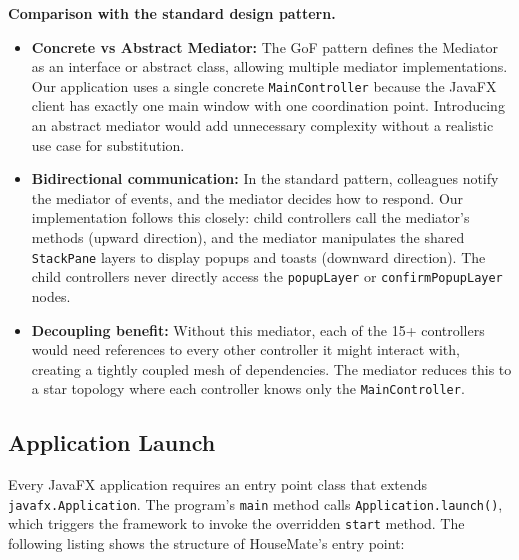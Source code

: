 \textbf{Comparison with the standard design pattern.}
\begin{itemize}
    \item \textbf{Concrete vs Abstract Mediator:} The GoF pattern defines the Mediator as an interface or abstract class, allowing multiple mediator implementations. Our application uses a single concrete \texttt{MainController} because the JavaFX client has exactly one main window with one coordination point. Introducing an abstract mediator would add unnecessary complexity without a realistic use case for substitution.
    \item \textbf{Bidirectional communication:} In the standard pattern, colleagues notify the mediator of events, and the mediator decides how to respond. Our implementation follows this closely: child controllers call the mediator's methods (upward direction), and the mediator manipulates the shared \texttt{StackPane} layers to display popups and toasts (downward direction). The child controllers never directly access the \texttt{popupLayer} or \texttt{confirmPopupLayer} nodes.
    \item \textbf{Decoupling benefit:} Without this mediator, each of the 15+ controllers would need references to every other controller it might interact with, creating a tightly coupled mesh of dependencies. The mediator reduces this to a star topology where each controller knows only the \texttt{MainController}.
\end{itemize}

\subsection{Application Launch}
\label{sec:app-launch}

Every JavaFX application requires an entry point class that extends \texttt{javafx.Application}. The program's \texttt{main} method calls \texttt{Application.launch()}, which triggers the framework to invoke the overridden \texttt{start} method. The following listing shows the structure of HouseMate's entry point:

